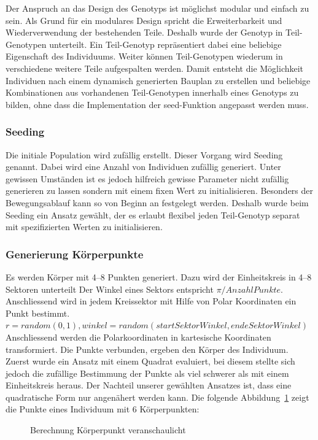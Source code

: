         Der Anspruch an das Design des Genotyps ist möglichst modular und einfach zu sein.
        Als Grund für ein modulares Design spricht die Erweiterbarkeit und Wiederverwendung der bestehenden Teile.
        Deshalb wurde der Genotyp in Teil-Genotypen unterteilt.
        Ein Teil-Genotyp repräsentiert dabei eine beliebige Eigenschaft des Individuums.
        Weiter können Teil-Genotypen wiederum in verschiedene weitere Teile aufgespalten werden.
        Damit entsteht die Möglichkeit Individuen nach einem dynamisch generierten Bauplan zu erstellen
        und beliebige Kombinationen aus vorhandenen Teil-Genotypen innerhalb eines Genotyps zu bilden,
        ohne dass die Implementation der seed-Funktion angepasst werden muss.

        \subsubsection{Seeding\label{subsub:GenotypeSeeding}}

          Die initiale Population wird zufällig erstellt. Dieser Vorgang wird Seeding genannt.
          Dabei wird eine Anzahl von Individuen zufällig generiert.
          Unter gewissen Umständen ist es jedoch hilfreich gewisse Parameter nicht zufällig generieren zu lassen
          sondern mit einem fixen Wert zu initialisieren.
          Besonders der Bewegungsablauf kann so von Beginn an festgelegt werden.
          Deshalb wurde beim Seeding ein Ansatz gewählt, der es erlaubt flexibel jeden Teil-Genotyp separat mit
          spezifizierten Werten zu initialisieren.

      \subsubsection{Generierung Körperpunkte\label{subsub:GenotypGenerierungKörperpunkte}}

        Es werden Körper mit 4--8 Punkten generiert. Dazu wird der Einheitskreis in 4--8 Sektoren unterteilt
        Der Winkel eines Sektors entspricht \(\pi / Anzahl Punkte\).
        \\
        Anschliessend wird in jedem Kreissektor mit Hilfe von Polar Koordinaten ein Punkt bestimmt.
        \\
        \( r = random (0, 1), winkel = random(startSektorWinkel, endeSektorWinkel ) \)
        Anschliessend werden die Polarkoordinaten in kartesische Koordinaten transformiert.
        Die Punkte verbunden, ergeben den Körper des Individuum.
        \\
        Zuerst wurde ein Ansatz mit einem Quadrat evaluiert, bei diesem stellte sich jedoch die zufällige Bestimmung
        der Punkte als viel schwerer als mit einem Einheitskreis heraus. Der Nachteil unserer gewählten
        Ansatzes ist, dass eine quadratische Form nur angenähert werden kann.
        Die folgende Abbildung~\ref{fig:kp} zeigt die Punkte eines Individuum mit 6 Körperpunkten:
        \\
        \begin{figure}[H]
          
          \caption{Berechnung Körperpunkt veranschaulicht\label{fig:kp}}
        \end{figure}

